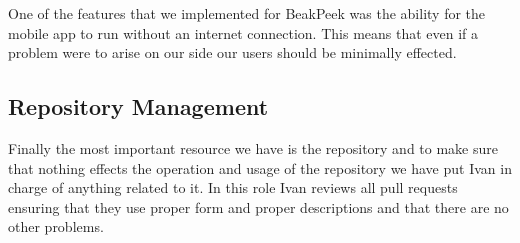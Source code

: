 \documentclass[a4paper]{article}
\begin{document}
One of the features that we implemented for BeakPeek was the ability for the mobile app to run 
without an internet connection. This means that even if a problem were to arise on our side our 
users should be minimally effected.

\subsection{Repository Management}

Finally the most important resource we have is the repository and to make sure that nothing 
effects the operation and usage of the repository we have put Ivan in charge of anything related 
to it. In this role Ivan reviews all pull requests ensuring that they use proper form and 
proper descriptions and that there are no other problems.
\end{document}
